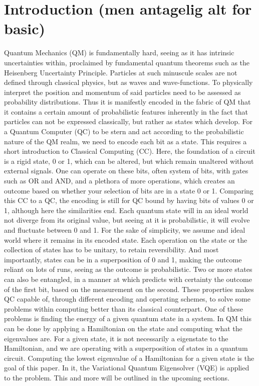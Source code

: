 \section{Introduction (men antagelig alt for basic)}
Quantum Mechanics (QM) is fundamentally hard, seeing as it has intrinsic uncertainties within, proclaimed by fundamental quantum theorems such as the Heisenberg Uncertainty Principle. Particles at such minuscule scales are not defined through classical physics, but as waves and wave-functions. To physically interpret the position and momentum of said particles need to be assessed as probability distributions. Thus it is manifestly encoded in the fabric of QM that it contains a certain amount of probabilistic features inherently in the fact that particles can not be expressed classically, but rather as states which develop. 
\newline\newline
For a Quantum Computer (QC) to be stern and act according to the probabilistic nature of the QM realm, we need to encode each bit as a state. This requires a short introduction to Classical Computing (CC). Here, the foundation of a circuit is a rigid state, 0 or 1, which can be altered, but which remain unaltered without external signals. One can operate on these bits, often system of bits, with gates such as OR and AND, and a plethora of more operations, which creates an outcome based on whether your selection of bits are in a state 0 or 1. 
\newline\newline
Comparing this CC to a QC, the encoding is still for QC bound by having bits of values 0 or 1, although here the similarities end. Each quantum state will in an ideal world not diverge from its original value, but seeing at it is probabilistic, it will evolve and fluctuate between 0 and 1. For the sake of simplicity, we assume and ideal world where it remains in its encoded state. Each operation on the state or the collection of states has to be unitary, to retain reversibility. And most importantly, states can be in a superposition of 0 and 1, making the outcome reliant on lots of runs, seeing as the outcome is probabilistic. Two or more states can also be entangled, in a manner at which predicts with certainty the outcome of the first bit, based on the measurement on the second. These properties makes QC capable of, through different encoding and operating schemes, to solve some problems within computing better than its classical counterpart. 
\newline\newline
One of these problems is finding the energy of a given quantum state in a system. In QM this can be done by applying a Hamiltonian on the state and computing what the eigenvalues are. For a given state, it is not necessarily a eigenstate to the Hamiltonian, and we are operating with a superposition of states in a quantum circuit. Computing the lowest eigenvalue of a Hamiltonian for a given state is the goal of this paper. In it, the Variational Quantum Eigensolver (VQE) is applied to the problem. This and more will be outlined in the upcoming sections.
